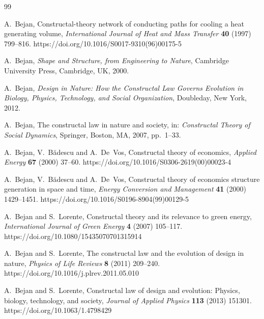 \documentclass[12pt]{article}
\theoremstyle{plain}
\theoremstyle{definition}
\theoremstyle{remark}
\begin{document}
\begin{thebibliography}{99}


A.~Bejan,
Constructal-theory network of conducting paths for cooling a heat generating volume,
\emph{International Journal of Heat and Mass Transfer}
\textbf{40} (1997) 799--816.
https://doi.org/10.1016/S0017-9310(96)00175-5

A.~Bejan,
\emph{Shape and Structure, from Engineering to Nature},
Cambridge University Press, Cambridge, UK, 2000.

A.~Bejan,
\emph{Design in Nature: How the Constructal Law Governs Evolution in Biology, Physics, Technology, and Social Organization},
Doubleday, New York, 2012.

A.~Bejan,
The constructal law in nature and society,
in: \emph{Constructal Theory of Social Dynamics},
Springer, Boston, MA, 2007, pp.~1--33.

A.~Bejan, V.~B\u{a}descu and A.~De~Vos,
Constructal theory of economics,
\emph{Applied Energy}
\textbf{67} (2000) 37--60.
https://doi.org/10.1016/S0306-2619(00)00023-4

A.~Bejan, V.~B\u{a}descu and A.~De~Vos,
Constructal theory of economics structure generation in space and time,
\emph{Energy Conversion and Management}
\textbf{41} (2000) 1429--1451.
https://doi.org/10.1016/S0196-8904(99)00129-5

A.~Bejan and S.~Lorente,
Constructal theory and its relevance to green energy,
\emph{International Journal of Green Energy}
\textbf{4} (2007) 105--117.
https://doi.org/10.1080/15435070701315914

A.~Bejan and S.~Lorente,
The constructal law and the evolution of design in nature,
\emph{Physics of Life Reviews}
\textbf{8} (2011) 209--240.
https://doi.org/10.1016/j.plrev.2011.05.010

A.~Bejan and S.~Lorente,
Constructal law of design and evolution: Physics, biology, technology, and society,
\emph{Journal of Applied Physics}
\textbf{113} (2013) 151301.
https://doi.org/10.1063/1.4798429


\end{thebibliography}
\end{document}
